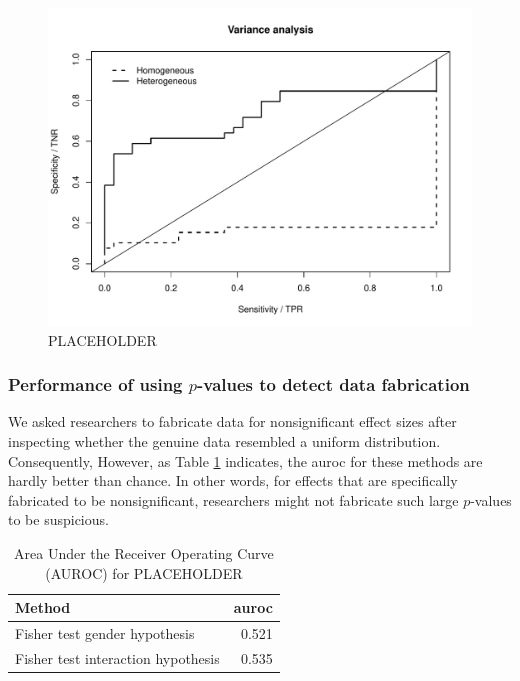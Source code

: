\documentclass{article}
\begin{document}
\begin{figure}[!ht]
\begin{center}
\includegraphics[width=\textwidth,height=\textheight,keepaspectratio]{../figures/varianceplot.pdf}
\caption{PLACEHOLDER}
\label{varianceplot}
\end{center}
\end{figure}

\subsubsection*{Performance of using $p$-values to detect data fabrication}

We asked researchers to fabricate data for nonsignificant effect sizes after inspecting whether the genuine data resembled a uniform distribution. Consequently,  However, as Table \ref{auroc_fisher} indicates, the auroc for these methods are hardly better than chance. In other words, for effects that are specifically fabricated to be nonsignificant, researchers might not fabricate such large $p$-values to be suspicious.

\begin{table}[ht]
\centering
\begin{tabular}{lr}
  \hline
Method & auroc \\ 
  \hline
Fisher test gender hypothesis & 0.521 \\ 
  Fisher test interaction hypothesis & 0.535 \\ 
   \hline
\end{tabular}
\caption{Area Under the Receiver Operating Curve (AUROC) for PLACEHOLDER} 
\label{auroc_fisher}
\end{table}
\end{document}
